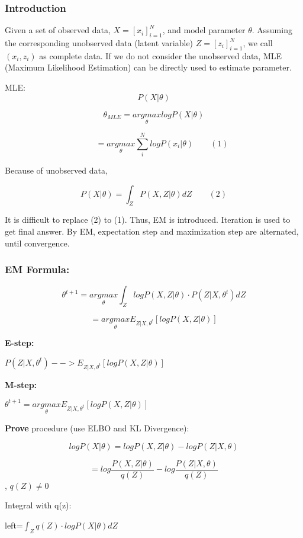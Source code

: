 \documentclass[
]{article}
\begin{document}
\hypertarget{introduction}{%
\subsubsection{Introduction}\label{introduction}}

Given a set of observed data, \(X=[{x_i}]_{i=1}^N\), and model parameter
\(\theta\). Assuming the corresponding unobserved data (latent variable)
\(Z=[{z_i}]_{i=1}^N\), we call \((x_i,z_i)\) as complete data. If we do
not consider the unobserved data, MLE (Maximum Likelihood Estimation)
can be directly used to estimate parameter.

MLE: \[P(X|\theta)\]

\[\theta_{MLE}=\underset {\theta}{argmax} logP(X|\theta)\]

\[\qquad =\underset {\theta}{argmax} \sum_i^N logP(x_i|\theta)  \qquad(1)\]

Because of unobserved data,

\[P(X|\theta)=\int_Z P(X,Z|\theta)dZ  \qquad(2)\]

It is difficult to replace (2) to (1). Thus, EM is introduced. Iteration
is used to get final answer. By EM, expectation step and maximization
step are alternated, until convergence.

\hypertarget{em-formula}{%
\subsubsection{EM Formula:}\label{em-formula}}

\[\theta^{t+1}=\underset {\theta}{argmax} \int_Z logP(X,Z|\theta)\cdot P(Z|X,\theta^t)dZ\]

\qquad \[=\underset {\theta}{argmax} E_{Z|X,\theta^t} [logP(X,Z|\theta)]\]

\textbf{E-step:}

\(P(Z|X,\theta^t)-->E_{Z|X,\theta^t} [logP(X,Z|\theta)]\)

\textbf{M-step:}

\(\theta^{t+1}=\underset {\theta}{argmax} E_{Z|X,\theta^t} [logP(X,Z|\theta)]\)

\textbf{Prove} procedure (use ELBO and KL Divergence):

\[logP(X|\theta)=logP(X,Z|\theta)-logP(Z|X,\theta)\]

\qquad \[ =log\frac {P(X,Z|\theta)} {q(Z)}-log\frac{P(Z|X,\theta)} {q(Z)}\],
\(q(Z)\neq 0\)

Integral with q(z):

left=\(\int_Z q(Z)\cdot logP(X|\theta)dZ\)
\end{document}
